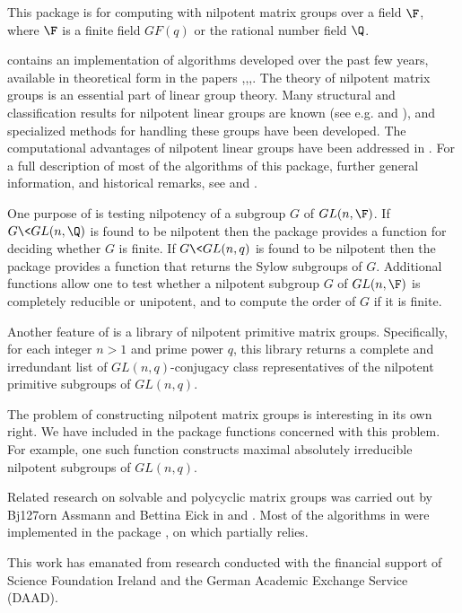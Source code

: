 

This package is for computing with nilpotent matrix groups over a
field $\F$, where $\F$ is a finite field $GF(q)$ or the rational
number field $\Q$.

 contains an implementation of algorithms
developed over the past few years, available in theoretical form
in the papers \cite{DF04},\cite{DF05b},\cite{DF06},\cite{DF07}.
The theory of nilpotent
matrix groups is an essential part of linear group theory. Many
structural and classification results for nilpotent linear groups
are known (see e.g. \cite{Sup76} and \cite{Weh73}), and specialized methods
for handling these groups have been developed. The computational
advantages of nilpotent linear groups have been addressed in
\cite{DF05a}. For a full description of most of the algorithms of
this package, further general information, and historical remarks,
see \cite{DF06} and \cite{DF07}.

One purpose of  is testing nilpotency of a
subgroup $G$ of $GL(n,\F)$. If $G\< GL(n,\Q)$ is found to be
nilpotent then the package provides a function for deciding
whether $G$ is finite. If $G\< GL(n,q)$ is found to be nilpotent
then the package provides a function that returns the Sylow
subgroups of $G$. Additional functions allow one to test whether a
nilpotent subgroup $G$ of $GL(n,\F)$ is completely reducible or
unipotent, and to compute the order of $G$ if it is finite.

Another feature of  is a library of nilpotent
primitive matrix groups. Specifically, for each integer $n>1$ and
prime power $q$, this library returns a complete and irredundant
list of $GL(n,q)$-conjugacy class representatives of the
nilpotent primitive subgroups of $GL(n,q)$.

The problem of constructing nilpotent matrix groups is interesting
in its own right. We have included in the package functions
concerned with this problem. For example, one such function
constructs maximal absolutely irreducible nilpotent subgroups of
$GL(n,q)$.

Related research on solvable and polycyclic matrix groups was
carried out by Bj\accent127orn Assmann and Bettina Eick in
\cite{AE05} and \cite{AE07}. Most of the algorithms in \cite{AE05} were
implemented in the {\GAP} package , on which
 partially relies.

This work has emanated from research conducted with the financial
support of Science Foundation Ireland and the German Academic
Exchange Service (DAAD).
